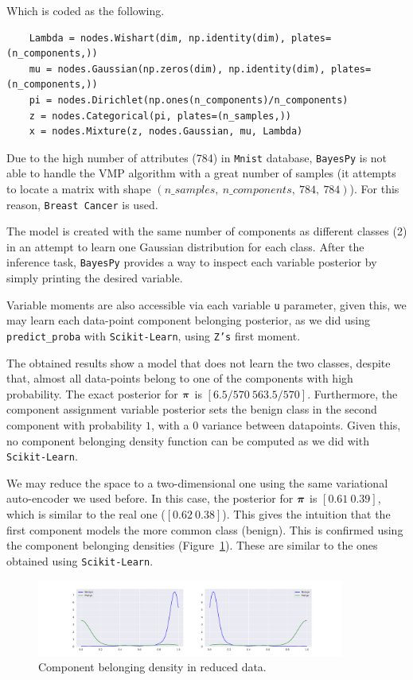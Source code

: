 Which is coded as the following.
\begin{verbatim}
    Lambda = nodes.Wishart(dim, np.identity(dim), plates=(n_components,))
    mu = nodes.Gaussian(np.zeros(dim), np.identity(dim), plates=(n_components,))
    pi = nodes.Dirichlet(np.ones(n_components)/n_components)
    z = nodes.Categorical(pi, plates=(n_samples,))
    x = nodes.Mixture(z, nodes.Gaussian, mu, Lambda)
\end{verbatim}

Due to the high number of attributes (784) in \texttt{Mnist} database, \texttt{BayesPy} is not able to handle the VMP algorithm with a great number of samples (it attempts to locate a matrix with shape \((n\_samples,\ n\_components,\ 784,\ 784)\)). For this reason, \texttt{Breast Cancer} is used.

The model is created with the same number of components as different classes (2) in an attempt to learn one Gaussian distribution for each class. After the inference task, \texttt{BayesPy} provides a way to inspect each variable posterior by simply printing the desired variable.

Variable moments are also accessible via each variable \texttt{u} parameter, given this, we may learn each data-point component belonging posterior, as we did using \texttt{predict\_proba} with \texttt{Scikit-Learn}, using \texttt{Z's} first moment.

The obtained results show a model that does not learn the two classes, despite that, almost all data-points belong to one of the components with high probability. The exact posterior for \(\bm{\pi}\) is \([6.5/570\  563.5/570]\). Furthermore, the component assignment variable posterior sets the benign class in the second component with probability \(1\), with a \(0\) variance between datapoints. Given this, no component belonging density function can be computed as we did with \texttt{Scikit-Learn}.

We may reduce the space to a two-dimensional one using the same variational auto-encoder we used before. In this case, the posterior for \(\bm{\pi}\) is \([0.61\ 0.39]\), which is similar to the real one (\([0.62\ 0.38]\)). This gives the intuition that the first component models the more common class (benign). This is confirmed using the component belonging densities (Figure~\ref{fig:proba_reduced_bayes}). These are similar to the ones obtained using \texttt{Scikit-Learn}.
 
\begin{figure}[h!]
  \centering
  \includegraphics[width=0.9\textwidth]{tex/images/proba_reduced_bayes.pdf}
  \caption{Component belonging density in reduced data.}\label{fig:proba_reduced_bayes}
\end{figure}

